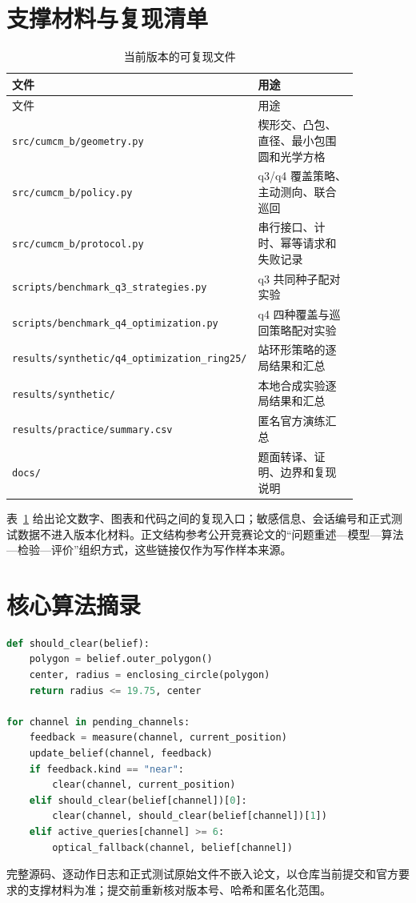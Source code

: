 \appendix
\section{支撑材料与复现清单}
\footnotesize\sloppy
\begin{longtable}{>{\raggedright\arraybackslash}p{0.31\linewidth}>{\raggedright\arraybackslash}p{0.55\linewidth}}
\caption{当前版本的可复现文件}\label{tab:q4-files}\\
\toprule 文件 & 用途 \\
\midrule\endfirsthead
\toprule 文件 & 用途 \\
\midrule\endhead
\nolinkurl{src/cumcm_b/geometry.py} & 楔形交、凸包、直径、最小包围圆和光学方格 \\
\nolinkurl{src/cumcm_b/policy.py} & q3/q4 覆盖策略、主动测向、联合巡回 \\
\nolinkurl{src/cumcm_b/protocol.py} & 串行接口、计时、幂等请求和失败记录 \\
\nolinkurl{scripts/benchmark_q3_strategies.py} & q3 共同种子配对实验 \\
\nolinkurl{scripts/benchmark_q4_optimization.py} & q4 四种覆盖与巡回策略配对实验 \\
\nolinkurl{results/synthetic/q4_optimization_ring25/} & 25 站环形策略的逐局结果和汇总 \\
\nolinkurl{results/synthetic/} & 本地合成实验逐局结果和汇总 \\
\nolinkurl{results/practice/summary.csv} & 匿名官方演练汇总 \\
\nolinkurl{docs/} & 题面转译、证明、边界和复现说明 \\
\bottomrule
\end{longtable}

表~\ref{tab:q4-files} 给出论文数字、图表和代码之间的复现入口；敏感信息、会话编号和正式测试数据不进入版本化材料。正文结构参考公开竞赛论文的“问题重述—模型—算法—检验—评价”组织方式\cite{award2020,award2022,award2023,award2024,award2025}，这些链接仅作为写作样本来源。

\section{核心算法摘录}
\begin{lstlisting}[language=Python,caption={安全清除判定的核心逻辑}]
def should_clear(belief):
    polygon = belief.outer_polygon()
    center, radius = enclosing_circle(polygon)
    return radius <= 19.75, center

for channel in pending_channels:
    feedback = measure(channel, current_position)
    update_belief(channel, feedback)
    if feedback.kind == "near":
        clear(channel, current_position)
    elif should_clear(belief[channel])[0]:
        clear(channel, should_clear(belief[channel])[1])
    elif active_queries[channel] >= 6:
        optical_fallback(channel, belief[channel])
\end{lstlisting}
完整源码、逐动作日志和正式测试原始文件不嵌入论文，以仓库当前提交和官方要求的支撑材料为准；提交前重新核对版本号、哈希和匿名化范围。
